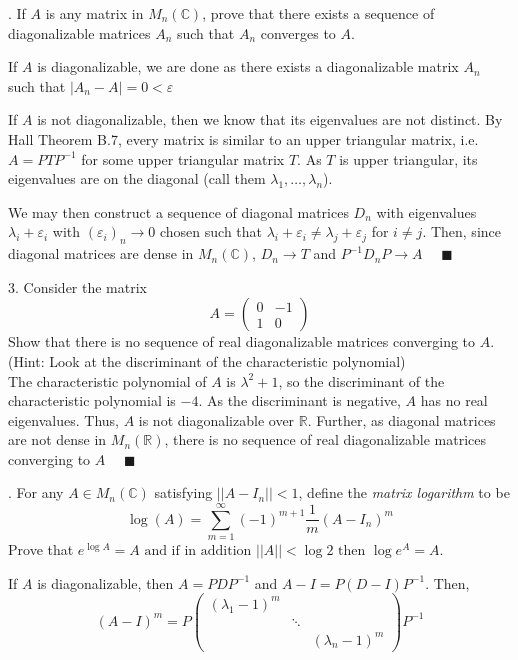 \documentclass[12pt]{article}
\newcommand{\C}{\mathbb{C}}
\newcommand{\R}{\mathbb{R}}
\renewcommand{\R}{\mathbb{R}}
\newcommand{\qed}{\quad \blacksquare}
\newcommand{\abs}[1]{\left\vert #1 \right\vert}
\begin{document}
.  If $A$ is any matrix in $M_{n}(\C)$, prove that there exists a sequence of diagonalizable matrices $A_{n}$ such that $A_{n}$ converges to $A$. 

    \color{blue}
        If $A$ is diagonalizable, we are done as there exists a diagonalizable matrix $A_n$ such that $\abs{A_n - A} = 0 < \varepsilon$ 
        
        If $A$ is not diagonalizable, then we know that its eigenvalues are not distinct. By Hall Theorem B.7, every matrix is similar to an upper triangular matrix, i.e. $A = PTP^{-1}$ for some upper triangular matrix $T$. As $T$ is upper triangular, its eigenvalues are on the diagonal (call them $\lambda_1, \dots, \lambda_n$). 
        
        We may then construct a sequence of diagonal matrices $D_n$ with eigenvalues $\lambda_i + \varepsilon_i$ with $(\varepsilon_i)_n \to 0$ chosen such that $\lambda_i + \varepsilon_i \neq \lambda_j + \varepsilon_j$ for $i \neq j$. Then, since diagonal matrices are dense in $M_n(\C)$, $D_n \to T$ and $P^{-1}D_nP \to A$ $\qed$
    \color{black}

\vspace*{1in}

3.  Consider the matrix
\[
A = \left(
\begin{array}{cc}
0 & -1 \\
1 & 0
\end{array}
\right)
\]
Show that there is no sequence of real diagonalizable matrices converging to $A$.  (Hint:  Look at the discriminant of the characteristic polynomial)\\

    \color{blue}
        The characteristic polynomial of $A$ is $\lambda^2 + 1$, so the discriminant of the characteristic polynomial is $-4$. As the discriminant is negative, $A$ has no real eigenvalues. Thus, $A$ is not diagonalizable over $\R$. Further, as diagonal matrices are not dense in $M_n(\R)$, there is no sequence of real diagonalizable matrices converging to $A$ $\qed$
    \color{black}

. For any $A \in M_{n}(\C)$ satisfying $||A - I_{n}|| < 1$, define the \emph{matrix logarithm} to be
\[\log(A) = \sum_{m=1}^{\infty} (-1)^{m+1}\frac{1}{m}\left(A-I_{n}\right)^{m}\]
Prove that $e^{\log A} = A \text{ and if in addition } ||A|| < \log 2 \text{ then } \log e^{A} = A$.

    \color{blue}
        If $A$ is diagonalizable, then $A = PDP^{-1}$ and $A - I = P(D - I)P^{-1}$. Then, 
        \[(A - I)^m = P \begin{pmatrix} 
            (\lambda_1 - 1)^m\\ 
            & \ddots\\
            && (\lambda_n - 1)^m
        \end{pmatrix}P^{-1}\]
        
\end{document}

